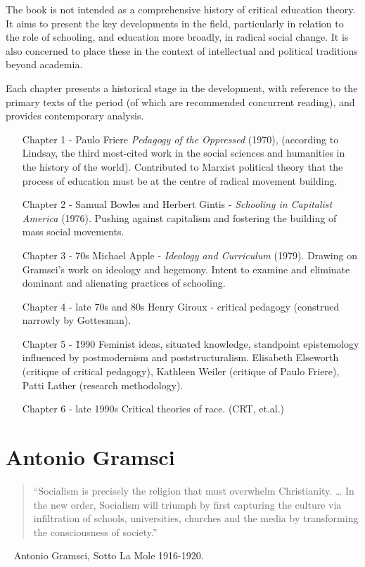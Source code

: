 \documentclass[10pt,titlepage]{book}
\begin{document}
The book is not intended as a comprehensive history of critical education theory.
It aims to present the key developments in the field, particularly in relation to the role of schooling, and education more broadly, in radical social change.
It is also concerned to place these in the context of intellectual and political traditions beyond academia.

Each chapter presents a historical stage in the development, with reference to the primary texts of the period (of which are recommended concurrent reading), and provides contemporary analysis.

\begin{itemize}
\item [Chapter 1 -]
  Paulo Friere \emph{Pedagogy of the Oppressed} (1970), (according to Lindsay, the third most-cited work in the social sciences and humanities in the history of the world).
  Contributed to Marxist political theory that the process of education must be at the centre of radical movement building.
\item [Chapter 2 -]
  Samual Bowles and Herbert Gintis - \emph{Schooling in Capitalist America} (1976).
  Pushing against capitalism and fostering the building of mass social movements.
\item [Chapter 3 - 70s]
  Michael Apple - \emph{Ideology and Curriculum} (1979).  Drawing on Gramsci's work on ideology and hegemony.
  Intent to examine and eliminate dominant and alienating practices of schooling.
\item [Chapter 4 - late 70s and 80s]
  Henry Giroux - critical pedagogy (construed narrowly by Gottesman).
\item [Chapter 5 - \~1990]
  Feminist ideas, situated knowledge, standpoint epistemology influenced by postmodernism and poststructuralism.
  Elisabeth Elseworth (critique of critical pedagogy), Kathleen Weiler (critique of Paulo Friere), Patti Lather (research methodology).
\item [Chapter 6 - late 1990s]
  Critical theories of race. (CRT, et.al.)
\end{itemize}

\pagebreak

\section{Antonio Gramsci}\label{Gramski}

\begin{quotation}“Socialism is precisely the religion that must overwhelm Christianity. … In the new order, Socialism will triumph by first capturing the culture via infiltration of schools, universities, churches and the media by transforming the consciousness of society.”
  \end{quotation}
~ Antonio Gramsci, Sotto La Mole 1916-1920.
\end{document}
